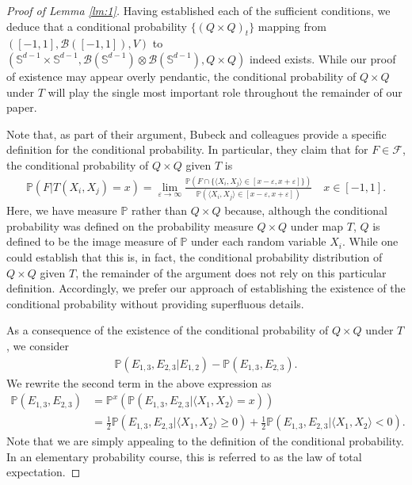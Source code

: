 \documentclass{article}
\begin{document}
\begin{proof}[Proof of Lemma \ref{lm:1}]
Having established each of the sufficient conditions, we deduce that a conditional probability $\{ (Q \times Q)_t\}$ mapping from $([-1, 1], \mathcal{B}([-1,1]), V)$ to $(\mathbb{S}^{d-1} \times \mathbb{S}^{d-1}, \mathcal{B}(\mathbb{S}^{d-1}) \otimes\mathcal{B}(\mathbb{S}^{d-1}), Q \times Q)$ indeed exists. While our proof of existence may appear overly pendantic, the conditional probability of $Q \times Q$ under $T$ will play the single most important role throughout the remainder of our paper. 

Note that, as part of their argument, Bubeck and colleagues provide a specific definition for the conditional probability. In particular, they claim that for $F \in \mathcal{F}$, the conditional probability of $Q \times Q$ given $T$  is 
\begin{align*}
    \mathbb{P}(F | T(X_i, X_j) = x) = \lim\limits_{\varepsilon \rightarrow \infty} \frac{\mathbb{P} \left(F \cap \{ \langle X_i, X_j \rangle \in [x - \varepsilon, x + \varepsilon] \} \right)}{\mathbb{P} \left( \langle X_i, X_j \rangle \in [x - \varepsilon, x + \varepsilon] \right)} \quad x \in [-1, 1].
\end{align*}
Here, we have measure $\mathbb{P}$ rather than $Q \times Q$ because, although the conditional probability was defined on the probability measure $Q \times Q$ under map $T$, $Q$ is defined to be the image measure of $\mathbb{P}$ under each random variable $X_i$. While one could establish that this is, in fact, the conditional probability distribution of $Q \times Q$ given $T$, the remainder of the argument does not rely on this particular definition. Accordingly, we prefer our approach of establishing the existence of the conditional probability without providing superfluous details.

As a consequence of the existence of the conditional probability of $Q \times Q$ under $T$, we consider
\begin{align*}
    \mathbb{P}(E_{1,3}, E_{2,3} | E_{1,2}) - \mathbb{P}(E_{1,3},E_{2,3}). 
\end{align*}
We rewrite the second term in the above expression as
\begin{align*}
    \mathbb{P}(E_{1, 3}, E_{2,3}) &= \mathbb{P}^x \left( \mathbb{P}(E_{1, 3}, E_{2,3}| \langle X_1, X_2 \rangle = x) \right)\\
    &= \frac{1}{2}\mathbb{P}(E_{1, 3}, E_{2,3}| \langle X_1, X_2 \rangle \geq 0) + \frac{1}{2}\mathbb{P}(E_{1, 3}, E_{2,3}| \langle X_1, X_2 \rangle < 0). 
\end{align*}
Note that we are simply appealing to the definition of the conditional probability. In an elementary probability course, this is referred to as the law of total expectation.


\end{proof}
\end{document}
